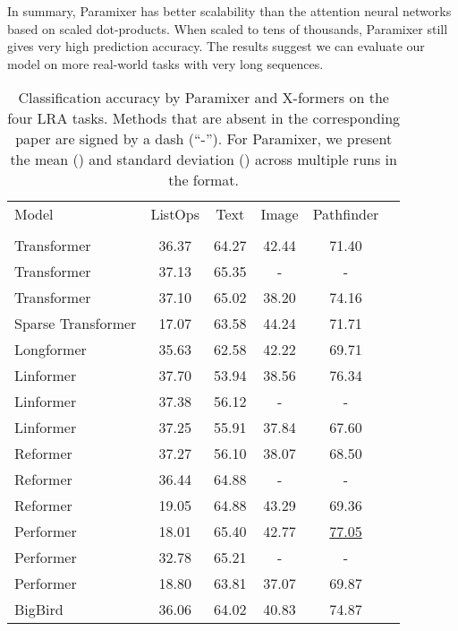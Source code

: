 \documentclass{article}
\begin{document}
In summary, Paramixer has better scalability than the attention neural networks based on scaled dot-products. When scaled to tens of thousands, Paramixer still gives very high prediction accuracy. The results suggest we can evaluate our model on more real-world tasks with very long sequences.

\setlength\tabcolsep{5pt}
\begin{table*}[t]
\centering
\caption{Classification accuracy by Paramixer and X-formers on the four LRA tasks. Methods that are absent in the corresponding paper are signed by a dash (``-''). For Paramixer, we present the mean () and standard deviation () across multiple runs in the  format.}
\label{tab:LRAacc}
\begin{tabular}{lccccc}
\hline\hline
Model              & ListOps & Text & Image &  Pathfinder\\
                   &  &  &  & \\
\hline
Transformer \cite{tay2020long}    & 36.37 & 64.27 & 42.44 &  71.40\\
Transformer  \cite{zhu2021long}   & 37.13 & 65.35 & -     &  -    \\
Transformer \cite{nystromformer}    & 37.10 & 65.02 & 38.20 &  74.16\\
\hline
Sparse Transformer \cite{tay2020long}   & 17.07 & 63.58 & 44.24 & 71.71\\
\hline
Longformer \cite{tay2020long}     & 35.63 & 62.58 & 42.22 & 69.71\\
\hline
Linformer \cite{tay2020long}      & 37.70 & 53.94 & 38.56 & 76.34\\
Linformer \cite{zhu2021long}      & 37.38 & 56.12 & -     & -    \\
Linformer \cite{nystromformer}      & 37.25 & 55.91 & 37.84 & 67.60\\
\hline
Reformer \cite{tay2020long}       & 37.27 & 56.10 & 38.07 & 68.50\\
Reformer \cite{zhu2021long}       & 36.44 & 64.88 & -     & -    \\
Reformer \cite{nystromformer}       & 19.05 & 64.88 & 43.29 & 69.36\\
\hline
Performer \cite{tay2020long}      & 18.01 & 65.40 & 42.77 & \underline{77.05}\\
Performer \cite{zhu2021long}      & 32.78 & 65.21 & -     & -    \\
Performer \cite{nystromformer}      & 18.80 & 63.81 & 37.07 & 69.87\\
\hline
BigBird \cite{tay2020long}        & 36.06 & 64.02 & 40.83 & 74.87\\

\end{tabular}
\end{table*}
\end{document}
